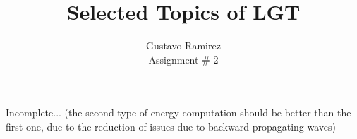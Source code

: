 \documentclass[11pt]{article}
\title{\textbf{Selected Topics of LGT}}
\author{Gustavo Ramirez\\
		Assignment \# 2}
\date{}
\begin{document}
\maketitle

Incomplete... (the second type of energy computation should be better than the first one, due to the reduction of issues due to backward propagating waves)
\end{document}
